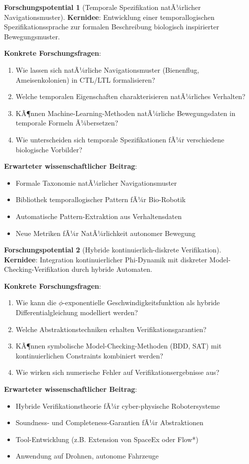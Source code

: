 ﻿\documentclass[a4paper,12pt]{article}
\theoremstyle{definition}
\newtheorem{potential}{Forschungspotential}[section]
\begin{document}
\begin{potential}[Temporale Spezifikation natÃ¼rlicher Navigationsmuster]
\textbf{Kernidee}: Entwicklung einer temporallogischen Spezifikationssprache zur formalen Beschreibung biologisch inspirierter Bewegungsmuster.

\textbf{Konkrete Forschungsfragen}:
\begin{enumerate}
	\item Wie lassen sich natÃ¼rliche Navigationsmuster (Bienenflug, Ameisenkolonien) in CTL/LTL formalisieren?
	\item Welche temporalen Eigenschaften charakterisieren natÃ¼rliches Verhalten?
	\item KÃ¶nnen Machine-Learning-Methoden natÃ¼rliche Bewegungsdaten in temporale Formeln Ã¼bersetzen?
	\item Wie unterscheiden sich temporale Spezifikationen fÃ¼r verschiedene biologische Vorbilder?
\end{enumerate}

\textbf{Erwarteter wissenschaftlicher Beitrag}:
\begin{itemize}
	\item Formale Taxonomie natÃ¼rlicher Navigationsmuster
	\item Bibliothek temporallogischer Pattern fÃ¼r Bio-Robotik
	\item Automatische Pattern-Extraktion aus Verhaltensdaten
	\item Neue Metriken fÃ¼r NatÃ¼rlichkeit autonomer Bewegung
\end{itemize}
\end{potential}

\begin{potential}[Hybride kontinuierlich-diskrete Verifikation]
\textbf{Kernidee}: Integration kontinuierlicher Phi-Dynamik mit diskreter Model-Checking-Verifikation durch hybride Automaten.

\textbf{Konkrete Forschungsfragen}:
\begin{enumerate}
	\item Wie kann die $\phi$-exponentielle Geschwindigkeitsfunktion als hybride Differentialgleichung modelliert werden?
	\item Welche Abstraktionstechniken erhalten Verifikationsgarantien?
	\item KÃ¶nnen symbolische Model-Checking-Methoden (BDD, SAT) mit kontinuierlichen Constraints kombiniert werden?
	\item Wie wirken sich numerische Fehler auf Verifikationsergebnisse aus?
\end{enumerate}

\textbf{Erwarteter wissenschaftlicher Beitrag}:
\begin{itemize}
	\item Hybride Verifikationstheorie fÃ¼r cyber-physische Robotersysteme
	\item Soundness- und Completeness-Garantien fÃ¼r Abstraktionen
	\item Tool-Entwicklung (z.B. Extension von SpaceEx oder Flow*)
	\item Anwendung auf Drohnen, autonome Fahrzeuge
\end{itemize}
\end{potential}
\end{document}
